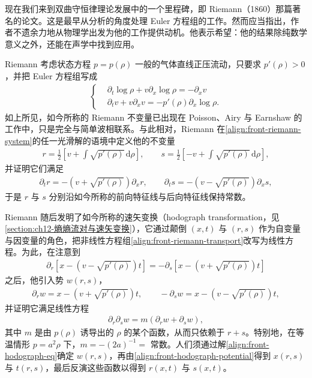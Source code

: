\documentclass[../../main.tex]{subfiles}
\begin{document}
现在我们来到双曲守恒律理论发展中的一个里程碑，即 Riemann（1860）那篇著名的论文。这是最早从分析的角度处理 Euler 方程组的工作。然而应当指出，作者不遗余力地从物理学出发为他的工作提供动机。他表示希望：他的结果除纯数学意义之外，还能在声学中找到应用。

Riemann 考虑状态方程 $p=p(\rho)$ 一般的气体直线正压流动，只要求 $p'(\rho)>0$，并把 Euler 方程组写成
\begin{align}
\left\{\begin{aligned}
&\partial_t\log\rho+v\partial_x\log\rho=-\partial_x v\\
&\partial_t v+v\partial_x v=-p'(\rho)\partial_x\log\rho.
\end{aligned}\right.\label{align:front-riemann-system}
\end{align}
如上所见，如今所称的 Riemann 不变量已出现在 Poisson、Airy 与 Earnshaw 的工作中，只是完全与简单波相联系。与此相对，Riemann 在\eqref{align:front-riemann-system}的任一光滑解的语境中定义他的不变量
\begin{align}
r=\frac{1}{2}\left[v+\int\sqrt{p'(\rho)}\,\mathrm{d}\rho\right],\qquad
s=\frac{1}{2}\left[-v+\int\sqrt{p'(\rho)}\,\mathrm{d}\rho\right],\label{align:front-riemann-invariants}
\end{align}
并证明它们满足
\begin{align}
\partial_t r=-\left(v+\sqrt{p'(\rho)}\right)\partial_x r,\qquad
\partial_t s=-\left(v-\sqrt{p'(\rho)}\right)\partial_x s,\label{align:front-riemann-transport}
\end{align}
于是 $r$ 与 $s$ 分别沿如今所称的前向特征线与后向特征线保持常数。

Riemann 随后发明了如今所称的速矢变换（hodograph transformation，见\cref{section:ch12-熵熵流对与速矢变换}），它通过颠倒 $(x,t)$ 与 $(r,s)$ 作为自变量与因变量的角色，把非线性方程组\eqref{align:front-riemann-transport}改写为线性方程。为此，在注意到
\begin{align}
\partial_r\left[x-\left(v-\sqrt{p'(\rho)}\right)t\right]=-\partial_s\left[x-\left(v+\sqrt{p'(\rho)}\right)t\right]\label{align:front-hodograph-identity}
\end{align}
之后，他引入势 $w(r,s)$，
\begin{align}
\partial_r w=x-\left(v+\sqrt{p'(\rho)}\right)t,\qquad
-\partial_s w=x-\left(v-\sqrt{p'(\rho)}\right)t,\label{align:front-hodograph-potential}
\end{align}
并证明它满足线性方程
\begin{align}
\partial_r\partial_s w=m(\partial_r w+\partial_s w),\label{align:front-hodograph-eq}
\end{align}
其中 $m$ 是由 $p(\rho)$ 诱导出的 $\rho$ 的某个函数，从而只依赖于 $r+s$。特别地，在等温情形 $p=a^{2}\rho$ 下，$m=-(2a)^{-1}=$ 常数。人们须通过解\eqref{align:front-hodograph-eq}确定 $w(r,s)$，再由\eqref{align:front-hodograph-potential}得到 $x(r,s)$ 与 $t(r,s)$，最后反演这些函数以得到 $r(x,t)$ 与 $s(x,t)$。
\end{document}
